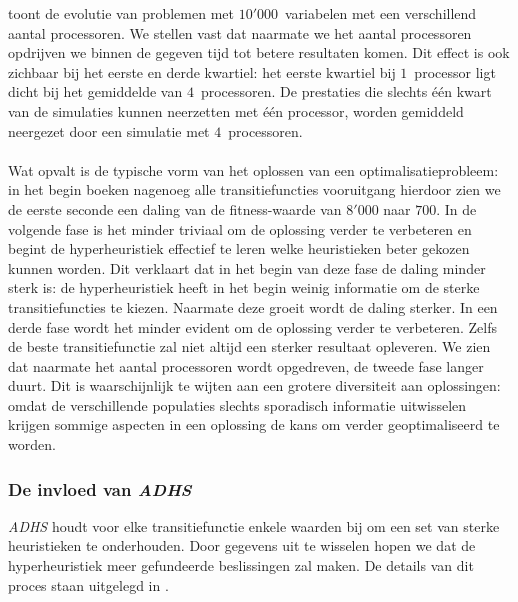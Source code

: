  toont de evolutie van problemen met $10'000$~variabelen met een verschillend aantal processoren. We stellen vast dat naarmate we het aantal processoren opdrijven we binnen de gegeven tijd tot betere resultaten komen. Dit effect is ook zichbaar bij het eerste en derde kwartiel: het eerste kwartiel bij $1$~processor ligt dicht bij het gemiddelde van $4$~processoren. De prestaties die slechts \'e\'en kwart van de simulaties kunnen neerzetten met \'e\'en processor, worden gemiddeld neergezet door een simulatie met $4$~processoren.
\paragraph{}
Wat opvalt is de typische vorm van het oplossen van een optimalisatieprobleem: in het begin boeken nagenoeg alle transitiefuncties vooruitgang hierdoor zien we de eerste seconde een daling van de fitness-waarde van $8'000$ naar $700$. In de volgende fase is het minder triviaal om de oplossing verder te verbeteren en begint de hyperheuristiek effectief te leren welke heuristieken beter gekozen kunnen worden. Dit verklaart dat in het begin van deze fase de daling minder sterk is: de hyperheuristiek heeft in het begin weinig informatie om de sterke transitiefuncties te kiezen. Naarmate deze groeit wordt de daling sterker. In een derde fase wordt het minder evident om de oplossing verder te verbeteren. Zelfs de beste transitiefunctie zal niet altijd een sterker resultaat opleveren. We zien dat naarmate het aantal processoren wordt opgedreven, de tweede fase langer duurt. Dit is waarschijnlijk te wijten aan een grotere diversiteit aan oplossingen: omdat de verschillende populaties slechts sporadisch informatie uitwisselen krijgen sommige aspecten in een oplossing de kans om verder geoptimaliseerd te worden.

\subsubsection{De invloed van \emph{ADHS}}


\emph{ADHS} houdt voor elke transitiefunctie enkele waarden bij om een set van sterke heuristieken te onderhouden. Door gegevens uit te wisselen hopen we dat de hyperheuristiek meer gefundeerde beslissingen zal maken. De details van dit proces staan uitgelegd in .

